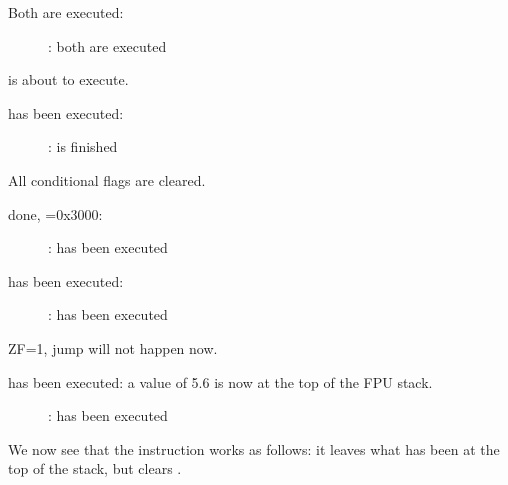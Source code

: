 \clearpage
{}

Both \FLD are executed:

\begin{figure}[H]
\centering
{}
\caption{\olly: both \FLD are executed}
\label{fig:FPU_comparison_Ox_case2_olly1}
\end{figure}

\FCOM is about to execute.

\clearpage
\FCOM has been executed:

\begin{figure}[H]
\centering
{}
\caption{\olly: \FCOM is finished}
\label{fig:FPU_comparison_Ox_case2_olly2}
\end{figure}

All conditional flags are cleared.

\clearpage
\FNSTSW done, =0x3000:

\begin{figure}[H]
\centering
{}
\caption{\olly: \FNSTSW has been executed}
\label{fig:FPU_comparison_Ox_case2_olly3}
\end{figure}

\clearpage
\TEST has been executed:

\begin{figure}[H]
\centering
{}
\caption{\olly: \TEST has been executed}
\label{fig:FPU_comparison_Ox_case2_olly4}
\end{figure}

ZF=1, jump will not happen now.

\clearpage
\FSTP {} has been executed: a value of 5.6 is now at the top of the FPU stack.

\begin{figure}[H]
\centering
{}
\caption{\olly: \FSTP has been executed}
\label{fig:FPU_comparison_Ox_case2_olly5}
\end{figure}

We now see that the \FSTP {} 
instruction works as follows: it leaves what has been at the top of the stack, but clears .

